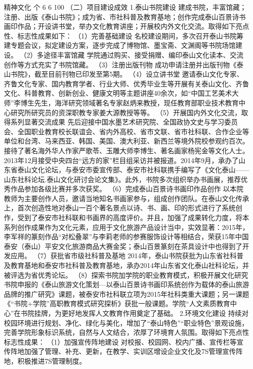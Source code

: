 精神文化
个
6
6
100%
（二）项目建设成效
1.泰山书院建设
建成书院，丰富馆藏；注册、出版《泰山书院》；成为省、市社科普及教育基地；创作完成泰山百景诗书画印作品；开设讲书堂，举办文化教育讲座；开展校内外文化交流。取得如下亮点性、标志性成果如下：
（1）完善基础建设
名校建设期间，多次召开泰山书院筹建专题会议，拟定建设方案，逐步完成了博物馆、墨宝斋、文渊阁等书院场馆建设。
（2）多途径丰富馆藏
学院通过购买、接受捐赠、编印泰山文化读本、交流创作等方式充实了书院馆藏。
（3）注册出版刊物
成功申请注册并出版刊物《泰山书院》，截至目前刊物已印发至第5期。
（4）设立讲书堂
邀请泰山文化专家、齐鲁文化专家、国内教育学者、行业大师、优秀毕业生等开展有关泰山文化、齐鲁文化、科普教育、创新创业、健康文明等主题讲座40余次，如“中国工艺美术大师”李博生先生，海洋研究领域著名专家赵炳来教授，现任教育部职业技术教育中心研究所研究员的资深职教专家姜大源教授等等。
（5）开展国内外文化交流，取得系列显著交流成果
先后迎接中国水墨艺术研究院、全国政协文史与学习委员会、全国职业教育校长联谊会、省内外高校、省市文联、省市社科联、合作企业等单位和台湾、马来西亚、韩国、美国、澳大利亚、新西兰等境外院校参观约百次。接待了著名海外华人作家严歌苓、玉雕大师李博生、著名画家杨宪金等文化人士。2013年12月接受中央四台“远方的家”栏目组采访并被报道。2014年9月，承办了山东省泰山文化论坛，与泰安市委宣传部、泰安市社科联携手编写了《文化泰山——山东社科论坛.泰山文化研讨会论文集》。此外，书院多次组织举办书画展，推荐优秀作品参加各级比赛并多次获奖。
（6）完成泰山百景诗书画印作品创作
以本院教师为主要创作人员，邀请当地知名书画家参与，组成创作团队。在泰山文化传承上，首次创造性地对泰山一百个著名景点以诗、书、画、印的形式进行了系统创作，受到了泰安市社科联和书画界的高度评价。并且，加强了成果转化力度，将本系列创作成果作为文化元素，应用于文化旅游产品设计当中，实效显著：2015年，李军祥的篆刻作品“对松叠翠”与李莉老师的参赛服饰设计等相结合，荣获15年中国泰安（泰山）平安文化旅游商品大赛金奖；泰山百景篆刻在茶具设计中也得到了开发应用。
（7）获批省市级社科普及基地
2014年，泰山书院获批为山东省社科普及教育基地和泰安市社科普及教育基地，承办2014年山东省文化泰山社科论坛，并被评选为省优秀论坛。
（8）探索书院加学院的职业教育模式，积极开展文化研究
书院申报的《泰山旅游文化策划—以泰山百景诗书画印系统创作为载体的泰山旅游品牌的推广研究》课题，被泰安市社科联立项为2015年社科类重大课题；另一课题《“书院+学院”高职教育模式研究探析》获批一般课题。学院“人文素质教育中心”在书院挂牌，为更好地发挥人文教育作用奠定了基础。 
2.环境文化建设
持续对校园环境进行规划、净化、绿化与美化，增加了“泰山特色”“职业特色”景观设施，完善学院形象标识系统，自然与人文结合，浓厚了环境育人氛围。取得如下亮点性标志性成果：
（1）加强宣传阵地建设
对校报、校园网、校内广播、宣传栏等宣传阵地加强了管理、补充、更新，在教学、实训区增设企业文化及7S管理宣传阵地，积极推进7S管理制度。
